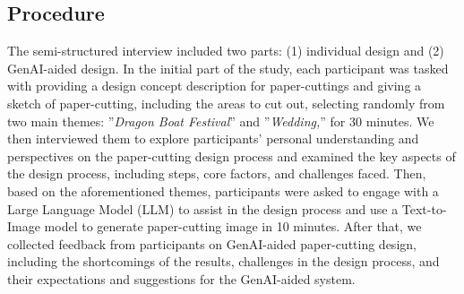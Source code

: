 \subsection{Procedure}
The semi-structured interview included two parts: (1) individual design and (2) GenAI-aided design.
In the initial part of the study, each participant was tasked with providing a design concept description for paper-cuttings and giving a sketch of paper-cutting, including the areas to cut out, selecting randomly from two main themes:  ''\textit{Dragon Boat Festival}'' and ''\textit{Wedding,}'' for 30 minutes. We then interviewed them to explore participants' personal understanding and perspectives on the paper-cutting design process and examined the key aspects of the design process, including steps, core factors, and challenges faced.
Then, based on the aforementioned themes, participants were asked to engage with a Large Language Model (LLM) to assist in the design process and use a Text-to-Image model to generate paper-cutting image in 10 minutes. After that, we collected feedback from participants on GenAI-aided paper-cutting design, including the shortcomings of the results, challenges in the design process, and their expectations and suggestions for the GenAI-aided system.



